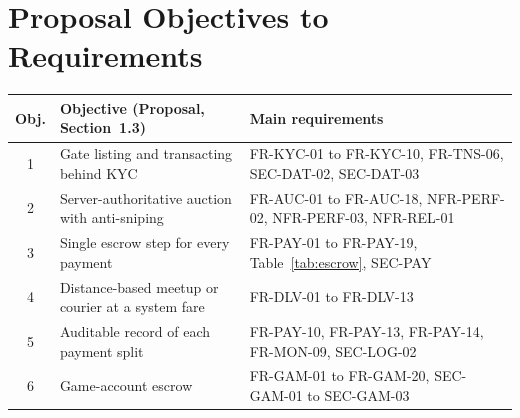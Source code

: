 \documentclass[11pt,a4paper]{report}
\begin{document}
\section{Proposal Objectives to Requirements}
\begin{center}
\small
\begin{tabularx}{\textwidth}{@{}c X >{\raggedright\arraybackslash}p{5.2cm}@{}}
\toprule
\textbf{Obj.} & \textbf{Objective (Proposal, Section~1.3)} & \textbf{Main requirements} \\
\midrule
1 & Gate listing and transacting behind KYC & FR-KYC-01 to FR-KYC-10, FR-TNS-06, SEC-DAT-02, SEC-DAT-03 \\
2 & Server-authoritative auction with anti-sniping & FR-AUC-01 to FR-AUC-18, NFR-PERF-02, NFR-PERF-03, NFR-REL-01 \\
3 & Single escrow step for every payment & FR-PAY-01 to FR-PAY-19, Table~\ref{tab:escrow}, SEC-PAY \\
4 & Distance-based meetup or courier at a system fare & FR-DLV-01 to FR-DLV-13 \\
5 & Auditable record of each payment split & FR-PAY-10, FR-PAY-13, FR-PAY-14, FR-MON-09, SEC-LOG-02 \\
6 & Game-account escrow & FR-GAM-01 to FR-GAM-20, SEC-GAM-01 to SEC-GAM-03 \\
\bottomrule
\end{tabularx}
\end{center}
\end{document}
